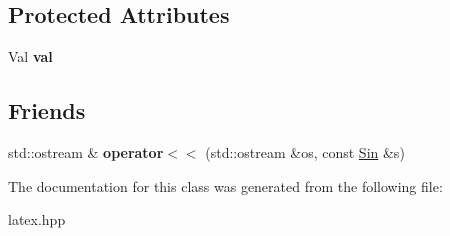 \subsection*{Protected Attributes}
\begin{DoxyCompactItemize}
\item 
\hypertarget{classlatex_1_1math_1_1Sin_a62c91117268adba66c6fba0f977c59e0}{Val {\bfseries val}}\label{classlatex_1_1math_1_1Sin_a62c91117268adba66c6fba0f977c59e0}

\end{DoxyCompactItemize}
\subsection*{Friends}
\begin{DoxyCompactItemize}
\item 
\hypertarget{classlatex_1_1math_1_1Sin_ae6da9fb3dd1757edf93df13422445c8f}{std\-::ostream \& {\bfseries operator$<$$<$} (std\-::ostream \&os, const \hyperlink{classlatex_1_1math_1_1Sin}{Sin} \&s)}\label{classlatex_1_1math_1_1Sin_ae6da9fb3dd1757edf93df13422445c8f}

\end{DoxyCompactItemize}


The documentation for this class was generated from the following file\-:\begin{DoxyCompactItemize}
\item 
latex.\-hpp\end{DoxyCompactItemize}
